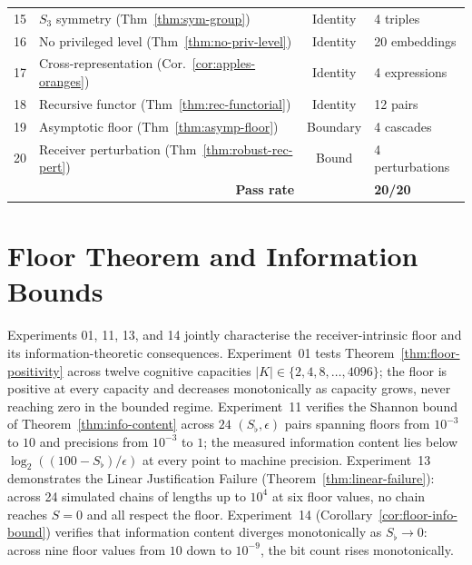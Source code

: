 \documentclass[twocolumn,11pt,a4paper]{article}
\theoremstyle{thmstyle}
\theoremstyle{thmstyle}
\theoremstyle{definition}
\theoremstyle{remark}
\begin{document}
\begin{table}[!htbp]
\begin{tabular}{rlcl}
15 & $S_3$ symmetry (Thm~\ref{thm:sym-group}) & Identity & 4 triples \\
16 & No privileged level (Thm~\ref{thm:no-priv-level}) & Identity & 20 embeddings \\
17 & Cross-representation (Cor.~\ref{cor:apples-oranges}) & Identity & 4 expressions \\
18 & Recursive functor (Thm~\ref{thm:rec-functorial}) & Identity & 12 pairs \\
19 & Asymptotic floor (Thm~\ref{thm:asymp-floor}) & Boundary & 4 cascades \\
20 & Receiver perturbation (Thm~\ref{thm:robust-rec-pert}) & Bound & 4 perturbations \\
\midrule
\multicolumn{2}{r}{\textbf{Pass rate}} & & \textbf{20/20} \\
\bottomrule
\end{tabular}
\end{table}

\section{Floor Theorem and Information Bounds}
\label{sec:val-floor}

Experiments 01, 11, 13, and 14 jointly characterise
the receiver-intrinsic floor and its
information-theoretic consequences.
Experiment~01 tests Theorem~\ref{thm:floor-positivity}
across twelve cognitive capacities $|K| \in
\{2, 4, 8, \ldots, 4096\}$; the floor is positive
at every capacity and decreases monotonically as
capacity grows, never reaching zero in the bounded
regime. Experiment~11 verifies the Shannon bound of
Theorem~\ref{thm:info-content} across $24$
$(S_\flat, \epsilon)$ pairs spanning floors from
$10^{-3}$ to $10$ and precisions from $10^{-3}$ to
$1$; the measured information content lies below
$\log_2((100 - S_\flat)/\epsilon)$ at every point
to machine precision.
Experiment~13 demonstrates the Linear Justification
Failure (Theorem~\ref{thm:linear-failure}): across
24 simulated chains of lengths up to $10^{4}$ at
six floor values, no chain reaches $S = 0$ and all
respect the floor.
Experiment~14 (Corollary~\ref{cor:floor-info-bound})
verifies that information content diverges
monotonically as $S_\flat \to 0$: across nine floor
values from $10$ down to $10^{-9}$, the bit count
rises monotonically.
\end{document}
